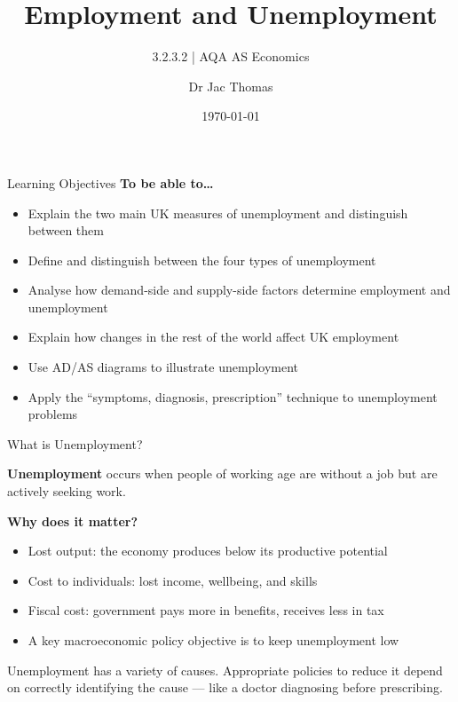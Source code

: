 \documentclass[16pt,aspectratio=169]{beamer}
\title{Employment and Unemployment}
\subtitle{3.2.3.2 | AQA AS Economics}
\author{Dr Jac Thomas}
\date{\today}
\begin{document}
\begin{frame}
    \titlepage
\end{frame}

\begin{frame}{Learning Objectives}
    \textbf{To be able to\ldots}
    \begin{itemize}
        \item Explain the two main UK measures of unemployment and distinguish between them
        \item Define and distinguish between the four types of unemployment
        \item Analyse how demand-side and supply-side factors determine employment and unemployment
        \item Explain how changes in the rest of the world affect UK employment
        \item Use AD/AS diagrams to illustrate unemployment
        \item Apply the ``symptoms, diagnosis, prescription'' technique to unemployment problems
    \end{itemize}
\end{frame}

\begin{frame}{What is Unemployment?}
    \begin{definition}
        \textbf{Unemployment} occurs when people of working age are without a job but are actively seeking work.
    \end{definition}

    \vspace{0.8em}
    \textbf{Why does it matter?}
    \begin{itemize}
        \item Lost output: the economy produces below its productive potential
        \item Cost to individuals: lost income, wellbeing, and skills
        \item Fiscal cost: government pays more in benefits, receives less in tax
        \item A key macroeconomic policy objective is to keep unemployment low
    \end{itemize}

    \vspace{0.5em}
    \begin{keypoint}
        Unemployment has a variety of causes. Appropriate policies to reduce it depend on correctly identifying the cause --- like a doctor diagnosing before prescribing.
    \end{keypoint}
\end{frame}
\end{document}
